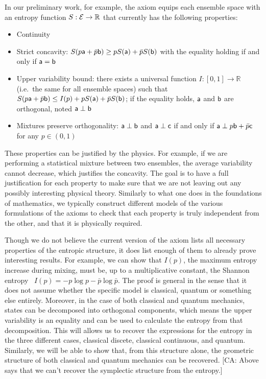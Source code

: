 In our preliminary work, for example, the axiom equips each ensemble space with an entropy function $S : \Ens \to \mathbb{R}$ that currently has the following properties:
\begin{itemize}
	\item Continuity
	\item Strict concavity: $S(p\ens[a] + \bar{p} \ens[b]) \geq p S(\ens[a]) + \bar{p} S(\ens[b])$ with the equality holding if and only if $\ens[a] = \ens[b]$
	\item Upper variability bound: there exists a universal function $I : [0,1] \to \mathbb{R}$ (i.e.~the same for all ensemble spaces) such that $S(p\ens[a] + \bar{p} \ens[b]) \leq I(p) + p S(\ens[a]) + \bar{p} S(\ens[b])$; if the equality holds, $\ens[a]$ and $\ens[b]$ are orthogonal, noted $\ens[a] \ortho \ens[b]$
	\item Mixtures preserve orthogonality: $\ens[a] \ortho \ens[b]$ and $\ens[a] \ortho \ens[c]$ if and only if $\ens[a] \ortho p \ens[b] + \bar{p} \ens[c]$ for any $p \in (0,1)$
\end{itemize}
These properties can be justified by the physics. For example, if we are performing a statistical mixture between two ensembles, the average variability cannot decrease, which justifies the concavity. The goal is to have a full justification for each property to make sure that we are not leaving out any possibly interesting physical theory. Similarly to what one does in the foundations of mathematics, we typically construct different models of the various formulations of the axioms to check that each property is truly independent from the other, and that it is physically required.

Though we do not believe the current version of the axiom lists all necessary properties of the entropic structure, it does list enough of them to already prove interesting results. For example, we can show that $I(p)$, the maximum entropy increase during mixing, must be, up to a multiplicative constant, the Shannon entropy~\cite{Shannon} $I(p)= - p \log p - \bar{p} \log \bar{p}$. The proof is general in the sense that it does not assume whether the specific model is classical, quantum or something else entirely. Moreover, in the case of both classical and quantum mechanics, states can be decomposed into orthogonal components, which means the upper variability is an equality and can be used to calculate the entropy from that decomposition. This will allows us to recover the expressions for the entropy in the three different cases, classical discete, classical continuous, and quantum. Similarly, we will be able to show that, from this structure alone, the geometric structure of both classical and quantum mechanics can be recovered. [CA: Above says that we can't recover the symplectic structure from the entropy.]

